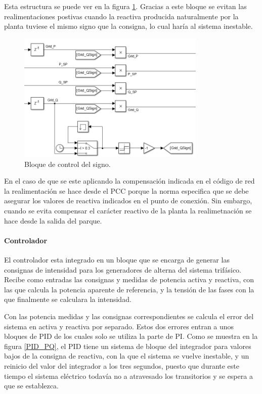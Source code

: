 \documentclass{book}
\begin{document}
Esta estructura se puede ver en la figura \ref{ControlSign}. Gracias a este bloque se evitan las realimentaciones postivas cuando la reactiva producida naturalmente por la planta tuviese el mismo signo que la consigna, lo cual har\'ia al sistema inestable.  \par

\begin{figure}[h!]
\centering
\includegraphics[width=0.8\textwidth]{ControlSign.PNG}
\caption{Bloque de control del signo. }
\label{ControlSign}
\end{figure} \par

En el caso de que se este aplicando la compensaci\'on indicada en el c\'odigo de red la realimentaci\'on se hace desde el PCC porque la norma especifica que se debe asegurar los valores de reactiva indicados en el punto de conexi\'on. Sin embargo, cuando se evita compensar el car\'acter reactivo de la planta la realimetnaci\'on se hace desde la salida del parque. \par

\paragraph{Controlador}

El controlador esta integrado en un bloque que se encarga de generar las consignas de intensidad para los generadores de alterna del sistema trif\'asico. Recibe como entradas las consignas y medidas de potencia activa y reactiva, con las que calcula la potencia aparente de referencia, y la tensi\'on de las fases con la que finalmente se calculara la intensidad. \par

Con las potencia medidas y las consignas correspondientes se calcula el error del sistema en activa y reactiva por separado. Estos dos errores entran a unos bloques de PID de los cuales solo se utiliza la parte de PI. Como se muestra en la figura \ref{PID_PQ}, el PID tiene un sistema de bloque del integrador para valores bajos de la consigna de reactiva, con la que el sistema se vuelve inestable, y un reinicio del valor del integrador a los tres segundos, puesto que durante este tiempo el sistema el\'ectrico todav\'ia no a atravesado los transitorios y se espera a que se establezca. \par
\end{document}
